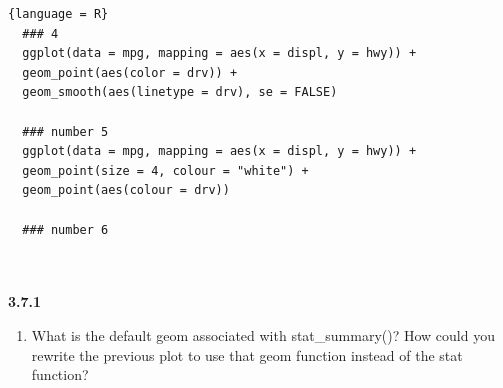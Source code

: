 \documentclass[11pt]{article}
\begin{document}
\begin{enumerate}
\begin{lstlisting}{language = R}
  ### 4 
  ggplot(data = mpg, mapping = aes(x = displ, y = hwy)) + 
  geom_point(aes(color = drv)) +
  geom_smooth(aes(linetype = drv), se = FALSE)
  
  ### number 5
  ggplot(data = mpg, mapping = aes(x = displ, y = hwy)) + 
  geom_point(size = 4, colour = "white") + 
  geom_point(aes(colour = drv))
  
  ### number 6
  
  
  \end{lstlisting}    
      
  \end{enumerate}
  
  
 \noindent\textbf{3.7.1} 
 \begin{enumerate}
 \item What is the default geom associated with stat\_summary()? How could you rewrite the previous plot to use that geom function instead of the stat function?
 
 \end{enumerate}
  
  
          
\end{document}
